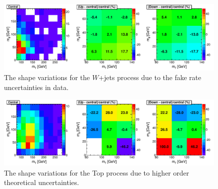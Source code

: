 \begin{figure}[!hbtp]
\centering
\includegraphics[width=1.0\textwidth]{figures/Wjets_WBounding_2D_mH125_0j_of.pdf}
\caption{ The shape variations for the $W$+jets process due to the fake rate uncertainties in data. }
\label{fig:wjets_shapevar_theory}
\end{figure}


\begin{figure}[!hbtp]
\centering
\includegraphics[width=1.0\textwidth]{figures/Top_TopBounding_2D_mH125_0j_of.pdf}
\caption{ The shape variations for the Top process due to higher order theoretical uncertainties.}
\label{fig:top_shapevar_theory}
\end{figure}



